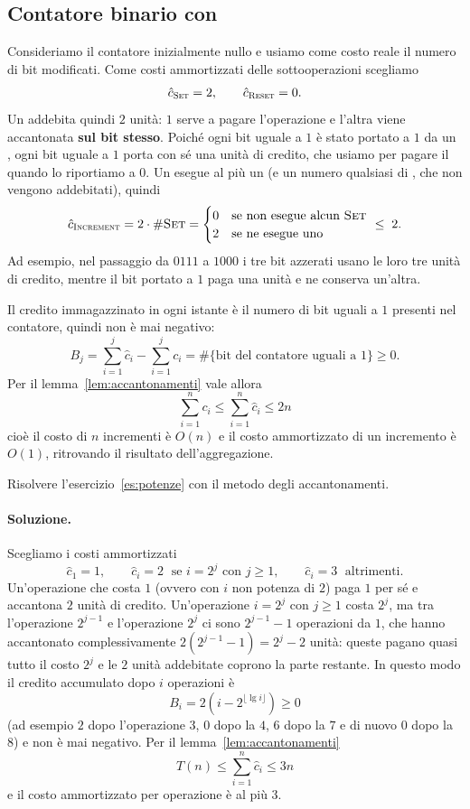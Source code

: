 \subsection{Contatore binario con \Increment}
Consideriamo il contatore inizialmente nullo e usiamo come costo reale il numero di bit modificati. Come costi ammortizzati delle sottooperazioni scegliamo
\[
\hat{c}_{\textsc{Set}} = 2, \qquad \hat{c}_{\textsc{Reset}} = 0.
\]
Un \SetBit{} addebita quindi $2$ unità: $1$ serve a pagare l'operazione e l'altra viene accantonata \textbf{sul bit stesso}. Poiché ogni bit uguale a $1$ è stato portato a $1$ da un \SetBit, ogni bit uguale a $1$ porta con sé una unità di credito, che usiamo per pagare il \ResetBit{} quando lo riportiamo a $0$. Un \Increment{} esegue al più un \SetBit{} (e un numero qualsiasi di \ResetBit, che non vengono addebitati), quindi
\[
\hat{c}_{\textsc{Increment}} = 2\cdot \#\textsc{Set} = \begin{cases} 0 & \text{se non esegue alcun } \textsc{Set} \\ 2 & \text{se ne esegue uno} \end{cases} \;\le\; 2.
\]
Ad esempio, nel passaggio da $0111$ a $1000$ i tre bit azzerati usano le loro tre unità di credito, mentre il bit portato a $1$ paga una unità e ne conserva un'altra.

Il credito immagazzinato in ogni istante è il numero di bit uguali a $1$ presenti nel contatore, quindi non è mai negativo:
\[
B_j = \sum_{i=1}^{j} \hat{c}_i - \sum_{i=1}^{j} c_i = \#\{\text{bit del contatore uguali a } 1\} \ge 0.
\]
Per il lemma~\ref{lem:accantonamenti} vale allora
\[
\sum_{i=1}^{n} c_i \le \sum_{i=1}^{n} \hat{c}_i \le 2n
\]
cioè il costo di $n$ incrementi è $O(n)$ e il costo ammortizzato di un incremento è $O(1)$, ritrovando il risultato dell'aggregazione.

\begin{esercizio}
Risolvere l'esercizio~\ref{es:potenze} con il metodo degli accantonamenti.
\end{esercizio}

\paragraph{Soluzione.}
Scegliamo i costi ammortizzati
\[
\hat{c}_1 = 1, \qquad \hat{c}_i = 2 \;\text{ se } i = 2^j \text{ con } j \ge 1, \qquad \hat{c}_i = 3 \;\text{ altrimenti}.
\]
Un'operazione che costa $1$ (ovvero con $i$ non potenza di $2$) paga $1$ per sé e accantona $2$ unità di credito. Un'operazione $i = 2^j$ con $j \ge 1$ costa $2^j$, ma tra l'operazione $2^{j-1}$ e l'operazione $2^j$ ci sono $2^{j-1}-1$ operazioni da $1$, che hanno accantonato complessivamente $2(2^{j-1}-1) = 2^j - 2$ unità: queste pagano quasi tutto il costo $2^j$ e le $2$ unità addebitate coprono la parte restante. In questo modo il credito accumulato dopo $i$ operazioni è
\[
B_i = 2\left(i - 2^{\lfloor \lg i \rfloor}\right) \ge 0
\]
(ad esempio $2$ dopo l'operazione $3$, $0$ dopo la $4$, $6$ dopo la $7$ e di nuovo $0$ dopo la $8$) e non è mai negativo. Per il lemma~\ref{lem:accantonamenti}
\[
T(n) \le \sum_{i=1}^{n} \hat{c}_i \le 3n
\]
e il costo ammortizzato per operazione è al più $3$.

